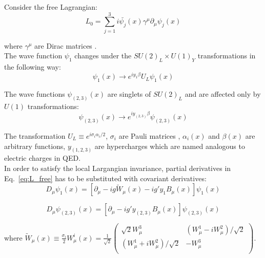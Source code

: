 Consider the free Lagrangian:\\

\begin{equation}\label{eq:L_free}
L_0 = \sum_{j=1}^{3} i \bar{\psi_j}(x) \gamma^\mu \partial_\mu \psi_j(x) 
\end{equation}

where $\gamma^\mu$ are Dirac matrices \cite{ref_Griffiths}.\\

The wave function $\psi_1$ changes under the $SU(2)_L \times U(1)_Y$ transformations in the following way:\\

\begin{equation}
\psi_1(x) \rightarrow e^{i y_1 \beta} U_L \psi_1(x)
\end{equation}


The wave functions $\psi_{(2,3)}(x)$ are singlets of $SU(2)_L$ and are affected only by $U(1)$ transformations:\\

\begin{equation}
\psi_{(2,3)}(x) \rightarrow e^{i y_{(2,3)} \beta} \psi_{(2,3)}(x)
\end{equation}

The transformation $U_L \equiv e^{i \sigma_i \alpha_i /2}$, $\sigma_i$ are Pauli matrices \cite{ref_Griffiths}, $\alpha_i(x)$ and $\beta(x)$ are arbitrary functions, $y_{(1,2,3)}$ are hypercharges which are named analogous to electric charges in QED.\\

In order to satisfy the local Largangian invariance, partial derivatives in Eq.~\ref{eq:L_free} has to be substituted with covariant derivatives:\\

\begin{equation}
D_\mu \psi_1(x) = [\partial_\mu - i g {\tilde{W}}_\mu(x) - i g' y_1 B_\mu(x) ] \psi_1(x) 
\end{equation}

\begin{equation}
D_\mu \psi_{(2,3)}(x) = [\partial_\mu - i g' y_{(2,3)} B_\mu(x) ] \psi_{(2,3)}(x) 
\end{equation}

where ${\tilde{W}}_\mu(x) \equiv \frac{\sigma_i}{2} W_\mu^i(x) = \frac{1}{\sqrt{2}} 
\begin{pmatrix}
\sqrt{2} W_\mu^3 & (W_\mu^1 - i W_\mu^2)/{\sqrt{2}}\\
(W_\mu^1 + i W_\mu^2)/{\sqrt{2}} & -W_\mu^3\\
\end{pmatrix}$.

